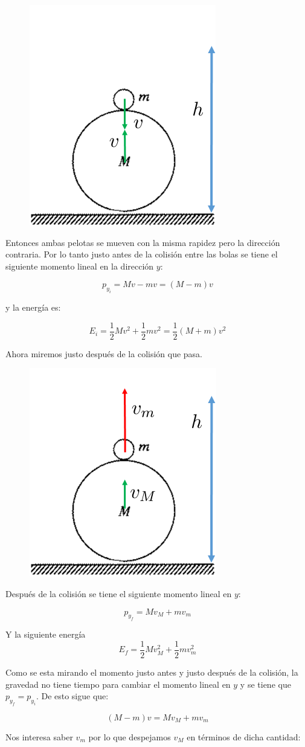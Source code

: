 \documentclass[a4paper,11pt]{article}
\theoremstyle{mytheor}
\begin{document}
\begin{figure}[h]
	\includegraphics[width=.3\linewidth]{2}
	\label{fcN4}
\end{figure}

Entonces ambas pelotas se mueven con la misma rapidez pero la dirección contraria. Por lo tanto justo antes de la colisión entre las bolas se tiene el siguiente momento lineal en la dirección $y$:

$$ p_{y_i} = M v - m v = (M-m)v$$

y la energía es:

$$ E_i= \frac{1}{2} M v^2 + \frac{1}{2} m v^2 = \frac{1}{2} (M+m) v^2 $$

Ahora miremos justo después de la colisión que pasa.

\begin{figure}[h]
	\includegraphics[width=.3\linewidth]{3}
	\label{fcN4}
\end{figure}

Después de la colisión se tiene el siguiente momento lineal en $y$:


$$ p_{y_f} = M v_M + m v_m $$

Y la siguiente energía
$$ E_f= \frac{1}{2} M v_M^2 + \frac{1}{2} m v_m^2 $$

Como se esta mirando el momento justo antes y justo después de la colisión, la gravedad no tiene tiempo para cambiar el momento lineal en $y$ y se tiene que $p_{y_f} = p_{y_i} $. De esto sigue que:

$$ (M-m)v = M v_M + m v_m $$


Nos interesa saber $v_m$ por lo que despejamos $v_M$ en términos de dicha cantidad:
\end{document}

